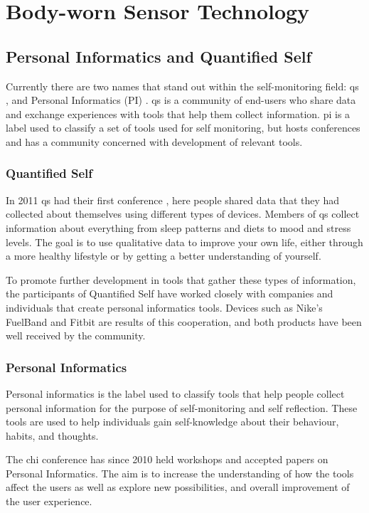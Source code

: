 \chapter{Body-worn Sensor Technology}

\section{Personal Informatics and Quantified Self}
Currently there are two names that stand out within the self-monitoring field: \gls{qs} \cite{quantifiedSelf}, and Personal Informatics (PI) \cite{personalInformatics}. \gls{qs} is a community of end-users who share data and exchange experiences with tools that help them collect information. \gls{pi} is a label used to classify a set of tools used for self monitoring, but hosts conferences and has a community concerned with development of relevant tools.

\subsection{Quantified Self}
In 2011 \gls{qs} had their first conference \cite{bodyHackers}, here people shared data that they had collected about themselves using different types of devices. Members of \gls{qs} collect information about everything from sleep patterns and diets to mood and stress levels. The goal is to use qualitative data to improve your own life, either through a more healthy lifestyle or by getting a better understanding of yourself. 

To promote further development in tools that gather these types of information, the participants of Quantified Self have worked closely with companies and individuals that create personal informatics tools. Devices such as Nike's FuelBand and Fitbit are results of this cooperation, and both products have been well received by the community.

\subsection{Personal Informatics}
Personal informatics is the label used to classify tools that help people collect personal information for the purpose of self-monitoring and self reflection. These tools are used to help individuals gain self-knowledge about their behaviour, habits, and thoughts.

The \gls{chi} conference has since 2010 \cite{chi2010} held workshops and accepted papers on Personal Informatics. The aim is to increase the understanding of how the tools affect the users as well as explore new possibilities, and overall improvement of the user experience.

